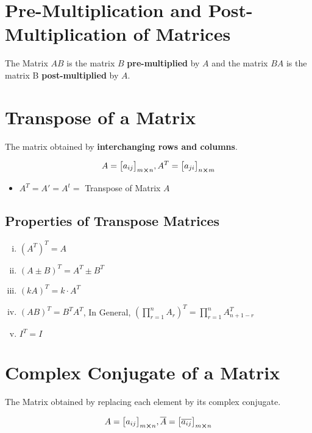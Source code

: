 \documentclass{article}
\begin{document}
\section{Pre-Multiplication and Post-Multiplication of Matrices}
The Matrix $AB$ is the matrix $B$ \textbf{pre-multiplied} by $A$ and the matrix $BA$ is the matrix B \textbf{post-multiplied} by $A$.

\section{Transpose of a Matrix}

The matrix obtained by \textbf{interchanging rows and columns}.

$$A={\begin{bmatrix}
        a_{ij}
    \end{bmatrix}}_{m \cross n}, A^T={\begin{bmatrix}
        a_{ji}
    \end{bmatrix}}_{n \cross m} $$

\begin{itemize}
    \item $A^T=A'=A^t=$ Transpose of Matrix $A$
\end{itemize}
\subsection{Properties of Transpose Matrices}

\begin{enumerate}[i.]
    \item $(A^T)^T=A $
    \item $(A\pm B)^T=A^T \pm B^T $
    \item $(kA)^T=k \cdot A^T $
    \item $(AB)^T=B^TA^T $, In General, $\left(\displaystyle\prod_{r=1}^{n} A_{r}\right)^T=\displaystyle\prod_{r=1}^{n} A^T_{n+1-r} $
    \item $I^T=I $
\end{enumerate}
\section{Complex Conjugate of a Matrix}
The Matrix obtained by replacing each element by its complex conjugate.

$$A={\begin{bmatrix}
        a_{ij}
    \end{bmatrix}}_{m \cross n}, \overline{A}={\begin{bmatrix}
                \overline{a_{ij}}
            \end{bmatrix}}_{m \cross n} $$
\end{document}
